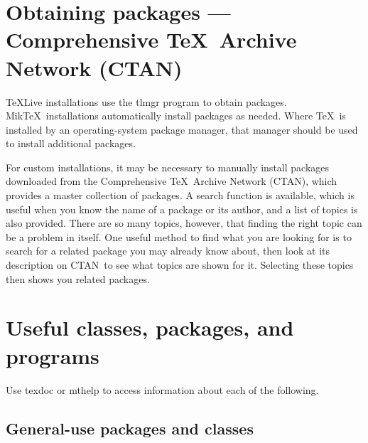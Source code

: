 \documentclass{article}
\def\CTAN{\acro{CTAN}}
\newcommand{\acro}[1]{\textsc{\MakeLowercase{#1}}}
\def\quad{ }%
\def\TeX{TeX}%
\def\Dash{ --- }%
\def\prog#1{\detokenize{#1}}%
\def\acro#1{#1}%
\renewcommand*{\quad}{ }
\renewcommand*{\prog}[1]{#1}
\renewcommand*{\TeX}{TeX}
\renewcommand*{\Dash}{ --- }
\begin{document}
\section{%
    Obtaining packages \Dash Comprehensive \TeX\ Archive Network \protect\quad (CTAN)%
}

\TeX{}Live installations use the \prog{tlmgr} program to obtain packages.
Mik\TeX\ installations automatically install packages as needed.
Where \TeX\ is installed by an operating-system package manager, that manager should
be used to install additional packages.

For custom installations, it may be necessary to manually install packages
downloaded from the Comprehensive \TeX\ Archive Network
(\CTAN), which provides a master collection of
packages.  A search function is available, which is useful when you know the
name of a package or its author, and a list of topics is also provided.
There are so many topics, however, that finding the right topic can be a
problem in itself.  One useful method to find what you are looking for is
to search for a related package you may already know about, then look at
its description on \CTAN\ to see what topics are shown for it.  Selecting these
topics then shows you related packages.



\section{Useful classes, packages, and programs}

Use \prog{texdoc} or \prog{mthelp} to access information about each of the following.

\subsection{General-use packages and classes}
\end{document}
